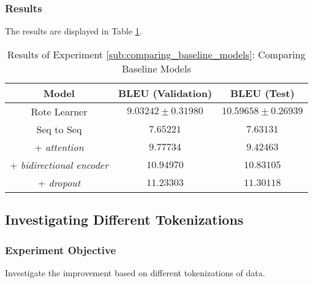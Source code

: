 \subsubsection{Results} %

The results are displayed in Table \ref{table:name_baseline}.

\begin{table}[h!]
\begin{center}
\begin{tabular}{ c | c | c }
    Model                           {}  & BLEU (Validation)  & BLEU (Test)    \\
    \hline
    Rote Learner                     & $ 9.03242 \pm  0.31980 $ & $ 10.59658 \pm 0.26939 $   \\
    \hline
    Seq to Seq                        & $ 7.65221 $  & $ 7.63131  $ \\
    + \textit{attention}              & $ 9.77734 $  & $ 9.42463  $ \\
    + \textit{bidirectional encoder}  & $ 10.94970 $ & $ 10.83105 $ \\
    + \textit{dropout}                & $ 11.23303 $ & $ 11.30118 $ \\
    \hline
\end{tabular}
\caption {Results of Experiment \ref{sub:comparing_baseline_models}: Comparing Baseline Models }
\label{table:name_baseline}
\end{center}
\end{table}




\subsection{Investigating Different Tokenizations} %
\label{sub:investigating_different_tokenizations}

\subsubsection{Experiment Objective} %


Investigate the improvement based on different tokenizations of data.

